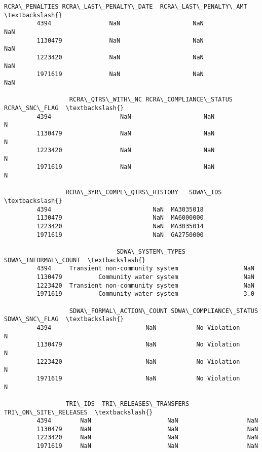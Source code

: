 \documentclass[11pt]{article}
\begin{document}
\begin{Verbatim}[commandchars=\\\{\}]
                  RCRA\_PENALTIES RCRA\_LAST\_PENALTY\_DATE  RCRA\_LAST\_PENALTY\_AMT  \textbackslash{}
         4394                NaN                    NaN                    NaN   
         1130479             NaN                    NaN                    NaN   
         1223420             NaN                    NaN                    NaN   
         1971619             NaN                    NaN                    NaN   
         
                  RCRA\_QTRS\_WITH\_NC RCRA\_COMPLIANCE\_STATUS RCRA\_SNC\_FLAG  \textbackslash{}
         4394                   NaN                    NaN             N   
         1130479                NaN                    NaN             N   
         1223420                NaN                    NaN             N   
         1971619                NaN                    NaN             N   
         
                 RCRA\_3YR\_COMPL\_QTRS\_HISTORY   SDWA\_IDS  \textbackslash{}
         4394                            NaN  MA3035018   
         1130479                         NaN  MA6000000   
         1223420                         NaN  MA3035014   
         1971619                         NaN  GA2750000   
         
                               SDWA\_SYSTEM\_TYPES  SDWA\_INFORMAL\_COUNT  \textbackslash{}
         4394     Transient non-community system                  NaN   
         1130479          Community water system                  NaN   
         1223420  Transient non-community system                  NaN   
         1971619          Community water system                  3.0   
         
                  SDWA\_FORMAL\_ACTION\_COUNT SDWA\_COMPLIANCE\_STATUS SDWA\_SNC\_FLAG  \textbackslash{}
         4394                          NaN           No Violation             N   
         1130479                       NaN           No Violation             N   
         1223420                       NaN           No Violation             N   
         1971619                       NaN           No Violation             N   
         
                 TRI\_IDS  TRI\_RELEASES\_TRANSFERS  TRI\_ON\_SITE\_RELEASES  \textbackslash{}
         4394        NaN                     NaN                   NaN   
         1130479     NaN                     NaN                   NaN   
         1223420     NaN                     NaN                   NaN   
         1971619     NaN                     NaN                   NaN   
         

\end{Verbatim}
\end{document}
